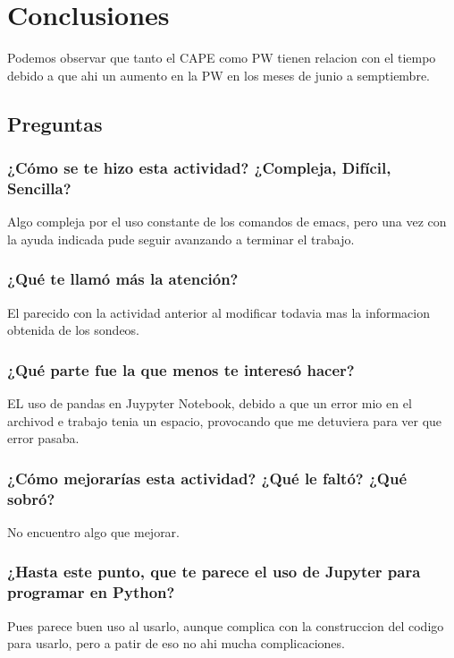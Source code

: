\documentclass{article}
\begin{document}
\section{Conclusiones}
Podemos observar que tanto el CAPE como PW tienen relacion con el tiempo debido a que ahi un aumento en la PW en los meses de junio a semptiembre. 
\subsection{Preguntas}
\subsubsection{¿Cómo se te hizo esta actividad? ¿Compleja, Difícil, Sencilla?}
Algo compleja por el uso constante de los comandos de emacs, pero una vez con la ayuda indicada pude seguir avanzando a terminar el trabajo.
\subsubsection{¿Qué te llamó más la atención?}
El parecido con la actividad anterior al modificar todavia mas la informacion obtenida de los sondeos.
\subsubsection{¿Qué parte fue la que menos te interesó hacer?}
EL uso de pandas en Juypyter Notebook, debido a que un error mio en el archivod e trabajo tenia un espacio, provocando que me detuviera para ver que error pasaba.
\subsubsection{¿Cómo mejorarías esta actividad? ¿Qué le faltó? ¿Qué sobró?}
No encuentro algo que mejorar.
\subsubsection{¿Hasta este punto, que te parece el uso de Jupyter para programar en Python?}
Pues parece buen uso al usarlo, aunque complica con la construccion del codigo para usarlo, pero a patir de eso no ahi mucha complicaciones.
\end{document}
